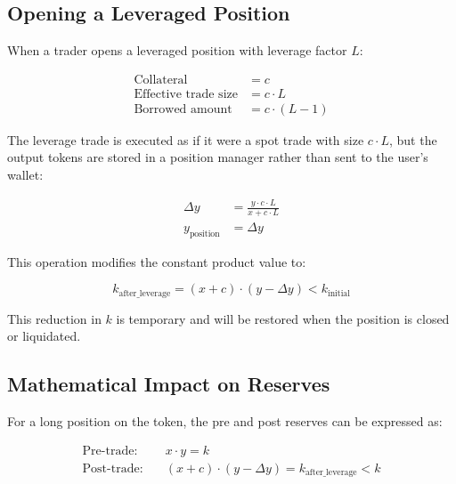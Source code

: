 \documentclass[11pt]{article}
\begin{document}
\subsection{Opening a Leveraged Position}

When a trader opens a leveraged position with leverage factor $L$:

\begin{equation}
\begin{aligned}
\text{Collateral} &= c \\
\text{Effective trade size} &= c \cdot L \\
\text{Borrowed amount} &= c \cdot (L - 1)
\end{aligned}
\end{equation}

The leverage trade is executed as if it were a spot trade with size $c \cdot L$, but the output tokens are stored in a position manager rather than sent to the user's wallet:

\begin{equation}
\begin{aligned}
\Delta y &= \frac{y \cdot c \cdot L}{x + c \cdot L} \\
y_{\text{position}} &= \Delta y
\end{aligned}
\end{equation}

This operation modifies the constant product value to:

\begin{equation}
k_{\text{after\_leverage}} = (x + c) \cdot (y - \Delta y) < k_{\text{initial}}
\end{equation}

This reduction in $k$ is temporary and will be restored when the position is closed or liquidated.

\subsection{Mathematical Impact on Reserves}

For a long position on the token, the pre and post reserves can be expressed as:

\begin{equation}
\begin{aligned}
\text{Pre-trade:} \quad &x \cdot y = k \\
\text{Post-trade:} \quad &(x + c) \cdot (y - \Delta y) = k_{\text{after\_leverage}} < k
\end{aligned}
\end{equation}
\end{document}
